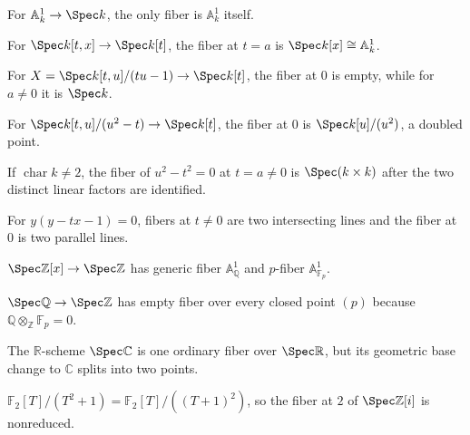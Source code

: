 \begin{example}\label{ex:vi25-r01}
For $\mathbb A^1_k\to\Spec k$, the only fiber is $\mathbb A^1_k$ itself.
\end{example}
\begin{example}\label{ex:vi25-r02}
For $\Spec k[t,x]\to\Spec k[t]$, the fiber at $t=a$ is $\Spec k[x]\cong\mathbb A^1_k$.
\end{example}
\begin{example}\label{ex:vi25-r03}
For $X=\Spec k[t,u]/(tu-1)\to\Spec k[t]$, the fiber at $0$ is empty, while for $a\ne0$ it is $\Spec k$.
\end{example}
\begin{example}\label{ex:vi25-r04}
For $\Spec k[t,u]/(u^2-t)\to\Spec k[t]$, the fiber at $0$ is $\Spec k[u]/(u^2)$, a doubled point.
\end{example}
\begin{example}\label{ex:vi25-r05}
If $\operatorname{char}k\ne2$, the fiber of $u^2-t^2=0$ at $t=a\ne0$ is $\Spec(k\times k)$ after the two distinct linear factors are identified.
\end{example}
\begin{example}\label{ex:vi25-r06}
For $y(y-tx-1)=0$, fibers at $t\ne0$ are two intersecting lines and the fiber at $0$ is two parallel lines.
\end{example}
\begin{example}\label{ex:vi25-r07}
$\Spec\mathbb Z[x]\to\Spec\mathbb Z$ has generic fiber $\mathbb A^1_{\mathbb Q}$ and $p$-fiber $\mathbb A^1_{\mathbb F_p}$.
\end{example}
\begin{example}\label{ex:vi25-r08}
$\Spec\mathbb Q\to\Spec\mathbb Z$ has empty fiber over every closed point $(p)$ because $\mathbb Q\otimes_{\mathbb Z}\mathbb F_p=0$.
\end{example}
\begin{example}\label{ex:vi25-r09}
The $\mathbb R$-scheme $\Spec\mathbb C$ is one ordinary fiber over $\Spec\mathbb R$, but its geometric base change to $\mathbb C$ splits into two points.
\end{example}
\begin{example}\label{ex:vi25-r10}
$\mathbb F_2[T]/(T^2+1)=\mathbb F_2[T]/((T+1)^2)$, so the fiber at $2$ of $\Spec\mathbb Z[i]$ is nonreduced.
\end{example}
